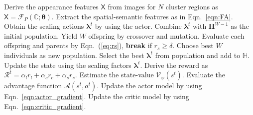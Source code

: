 \documentclass[letterpaper]{article} %
\newcommand\blue[1]{\textcolor{blue}{#1}}
\newcommand\rjf[1]{\textcolor{red}{\{RJF: #1\}}}
\begin{document}
\begin{algorithm}[ht]
\begin{algorithmic}[1]
    \STATE Derive the appearance features $\bm{\mathsf{X}}$ from images for $N$ cluster regions as $\bm{\mathsf{X}}
   = \mathcal{F}_{P}\left(\mathbb{C}; \bm{\theta}\right)$.
    \STATE Extract the spatial-semantic features as in Eqn.~\eqref{eqn:FA}.
      \STATE Obtain the scaling actions $\bm{\lambda}^t$ by using the actor.
    \STATE Combine $\bm{\lambda}^t$ with $\bm{H}^{W-1}$ as the initial population.
      \STATE Yield $W$ offspring by crossover and mutation.
      \STATE Evaluate each offspring and parents by Eqn.~(\ref{eq:rs}), \textbf{break} if $r_s \geq \delta$.
      \STATE Choose best $W$ individuals as new population.
    \ENDFOR %
    \STATE Select the best $\bm{\lambda}^t$ from population and add to $\mathbb{H}$.
    \STATE Update the state using the scaling factors $\bm{\lambda}^t$.
    \STATE Derive the reward as $\mathcal{R}^t = \alpha_l r_l +\alpha_c r_c + \alpha_s r_s$.
    \STATE Estimate the state-value $\mathcal{V}_\varphi\left(s^t\right)$.
    \STATE Evaluate the advantage function $\mathcal{A}(s^t, a^t)$.
    \STATE Update the actor model by using Eqn.~\eqref{eqn:actor_gradient}.
    \STATE Update the critic model by using Eqn.~\eqref{eqn:critic_gradient}.
  \ENDFOR
\ENDFOR

\end{algorithmic}
\end{algorithm}
\end{document}
